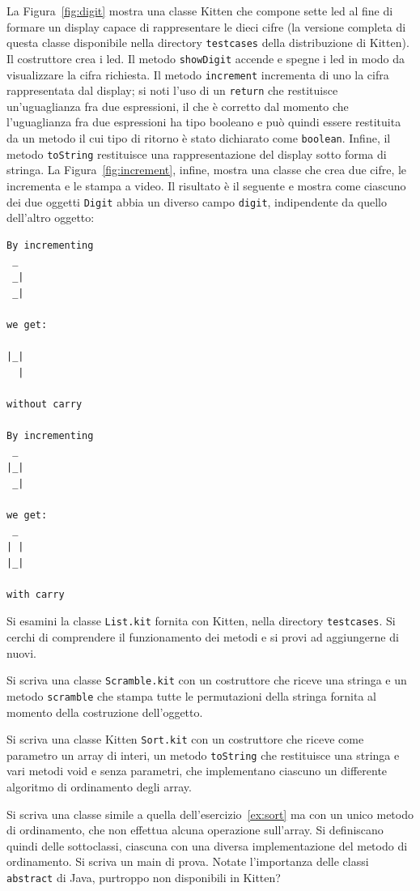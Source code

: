 La Figura~\ref{fig:digit} mostra una classe Kitten che compone sette
led al fine di formare un display capace di rappresentare le dieci cifre
(la versione completa di questa classe \e disponibile nella directory
\texttt{testcases} della distribuzione di Kitten).
Il costruttore crea i led. Il metodo \texttt{showDigit} accende e spegne
i led in modo da visualizzare la cifra richiesta. Il metodo
\texttt{increment} incrementa di uno la cifra rappresentata dal display;
si noti l'uso di un \texttt{return} che restituisce un'uguaglianza fra
due espressioni, il che \`e corretto dal momento che l'uguaglianza fra due
espressioni ha tipo booleano e pu\`o quindi essere restituita da un metodo
il cui tipo di ritorno \`e stato dichiarato come \texttt{boolean}.
Infine, il metodo \texttt{toString} restituisce una rappresentazione del
display sotto forma di stringa.
La Figura~\ref{fig:increment}, infine, mostra una classe che crea
due cifre, le incrementa e le stampa a video. Il risultato \`e il seguente
e mostra come ciascuno dei due oggetti \texttt{Digit} abbia un diverso
campo \texttt{digit}, indipendente da quello dell'altro oggetto:
%
\begin{verbatim}
By incrementing
 _
 _|
 _|

we get:

|_|
  |

without carry

By incrementing
 _
|_|
 _|

we get:
 _
| |
|_|

with carry
\end{verbatim}
%
\clearpage
%
\begin{exercise}\label{ex:list}
Si esamini la classe \texttt{List.kit} fornita con Kitten, nella
directory \texttt{testcases}. Si cerchi di comprendere il funzionamento
dei metodi e si provi ad aggiungerne di nuovi.
\end{exercise}
%
\begin{exercise}\label{ex:scramble}
Si scriva una classe \texttt{Scramble.kit} con un costruttore che riceve
una stringa e un metodo \texttt{scramble} che stampa tutte le permutazioni
della stringa fornita al momento della costruzione dell'oggetto.
\end{exercise}
%
\begin{exercise}\label{ex:sort}
Si scriva una classe Kitten \texttt{Sort.kit} con un costruttore che
riceve come parametro un array di interi, un metodo \texttt{toString} che
restituisce una stringa e vari metodi void e senza parametri,
che implementano ciascuno un differente algoritmo di ordinamento degli array.
\end{exercise}
%
\begin{exercise}\label{ex:sort2}
Si scriva una classe simile a quella dell'esercizio~\ref{ex:sort} ma
con un unico metodo di ordinamento, che non effettua alcuna operazione
sull'array. Si definiscano quindi delle sottoclassi, ciascuna
con una diversa implementazione del metodo di ordinamento. Si scriva un
main di prova. Notate l'importanza delle classi \texttt{abstract} di Java,
purtroppo non disponibili in Kitten?
\end{exercise}
